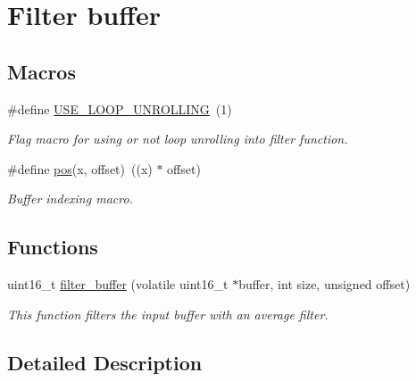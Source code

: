 \hypertarget{group___filter__module__group}{}\section{Filter buffer}
\label{group___filter__module__group}
\subsection*{Macros}
\begin{DoxyCompactItemize}
\item 
\mbox{\label{group___filter__module__group_ga1646c21a91b653eeb516c9d508c1cab6}} 
\#define \mbox{\hyperlink{group___filter__module__group_ga1646c21a91b653eeb516c9d508c1cab6}{U\+S\+E\+\_\+\+L\+O\+O\+P\+\_\+\+U\+N\+R\+O\+L\+L\+I\+NG}}~(1)
\begin{DoxyCompactList}\small\item\em Flag macro for using or not loop unrolling into filter function. \end{DoxyCompactList}\item 
\mbox{\label{group___filter__module__group_gaa505bfa61df2c48cb76be56720dae3d1}} 
\#define \mbox{\hyperlink{group___filter__module__group_gaa505bfa61df2c48cb76be56720dae3d1}{pos}}(x,  offset)~((x) $\ast$ offset)
\begin{DoxyCompactList}\small\item\em Buffer indexing macro. \end{DoxyCompactList}\end{DoxyCompactItemize}
\subsection*{Functions}
\begin{DoxyCompactItemize}
\item 
uint16\+\_\+t \mbox{\hyperlink{group___filter__module__group_ga676952eee893902e5a15b3f5adca1f86}{filter\+\_\+buffer}} (volatile uint16\+\_\+t $\ast$buffer, int size, unsigned offset)
\begin{DoxyCompactList}\small\item\em This function filters the input buffer with an average filter. \end{DoxyCompactList}\end{DoxyCompactItemize}


\subsection{Detailed Description}


